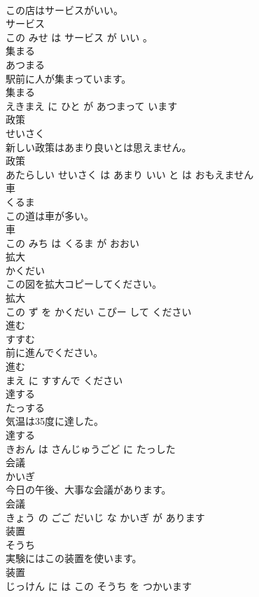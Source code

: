 \documentclass[8pt]{extreport}
\begin{document}
\begin{CJK}{UTF8}{min}
\\	この店はサービスがいい。	
\\	サービス 
\\	この みせ は サービス が いい 。			
\\	集まる	
\\	あつまる			
\\	駅前に人が集まっています。	
\\	集まる 
\\	えきまえ に ひと が あつまって います			
\\	政策	
\\	せいさく			
\\	新しい政策はあまり良いとは思えません。	
\\	政策 
\\	あたらしい せいさく は あまり いい と は おもえません			
\\	車	
\\	くるま			
\\	この道は車が多い。	
\\	車 
\\	この みち は くるま が おおい			
\\	拡大	
\\	かくだい			
\\	この図を拡大コピーしてください。	
\\	拡大 
\\	この ず を かくだい こぴー して ください			
\\	進む	
\\	すすむ			
\\	前に進んでください。	
\\	進む 
\\	まえ に すすんで ください			
\\	達する	
\\	たっする			
\\	気温は35度に達した。	
\\	達する 
\\	きおん は さんじゅうごど に たっした			
\\	会議	
\\	かいぎ			
\\	今日の午後、大事な会議があります。	
\\	会議 
\\	きょう の ごご だいじ な かいぎ が あります			
\\	装置	
\\	そうち			
\\	実験にはこの装置を使います。	
\\	装置 
\\	じっけん に は この そうち を つかいます			

\end{CJK}
\end{document}
